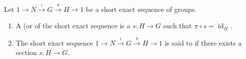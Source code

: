 \begin{definition} \label{definition:section_and_splitting_of_a_short_exact_sequence_of_groups}
Let $1 \longrightarrow N \xrightarrow{\iota} G \xrightarrow{\pi} H \longrightarrow 1$ be a short exact sequence of groups. 
\begin{enumerate}
    \item A  (or  of the short exact sequence is a  $s: H \to G$ such that $\pi \circ s = \operatorname{id}_H$.

    \item The short exact sequence $1 \longrightarrow N \xrightarrow{\iota} G \xrightarrow{\pi} H \longrightarrow 1$ is said to  if there exists a section $s: H \to G$.
\end{enumerate}
\end{definition}